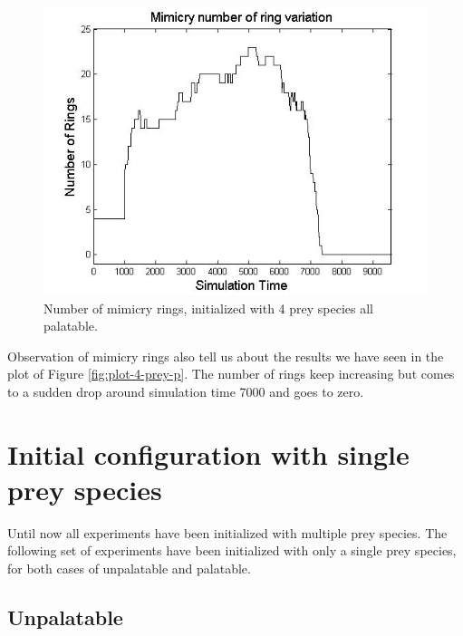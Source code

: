 \begin{figure}[H]
	\centering
	\includegraphics[scale=0.50]{images/ringSize10k-4Prey-p}
	\caption[Number of mimicry rings (4 prey species all palatable)]{Number of mimicry rings, initialized with 4 prey species all palatable.}
	\label{fig:ringSize8k-4-Prey-p}
\end{figure}

Observation of mimicry rings also tell us about the results we have seen in the plot of Figure \ref{fig:plot-4-prey-p}. The number of rings keep increasing but comes to a sudden drop around simulation time 7000 and goes to zero.

\section{Initial configuration with single prey species}
Until now all experiments have been initialized with multiple prey species. The following set of experiments have been initialized with only a single prey species, for both cases of unpalatable and palatable.

\subsection{Unpalatable}
\label{subsec:single-prey-unpalatable}


